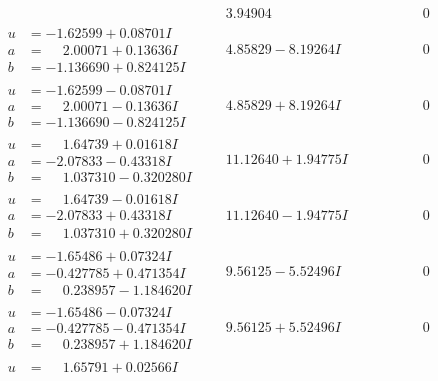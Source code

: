 \documentclass[1p]{elsarticle_modified}
\theoremstyle{definition}
\begin{document}
$$\begin{array}{c|c|c}
 & \phantom{-}3.94904\phantom{ +0.000000I} & \phantom{-0.000000 } 0 \\ \hline\begin{aligned}
u &= -1.62599 + 0.08701 I \\
a &= \phantom{-}2.00071 + 0.13636 I \\
b &= -1.136690 + 0.824125 I\end{aligned}
 & \phantom{-}4.85829 - 8.19264 I & \phantom{-0.000000 } 0 \\ \hline\begin{aligned}
u &= -1.62599 - 0.08701 I \\
a &= \phantom{-}2.00071 - 0.13636 I \\
b &= -1.136690 - 0.824125 I\end{aligned}
 & \phantom{-}4.85829 + 8.19264 I & \phantom{-0.000000 } 0 \\ \hline\begin{aligned}
u &= \phantom{-}1.64739 + 0.01618 I \\
a &= -2.07833 - 0.43318 I \\
b &= \phantom{-}1.037310 - 0.320280 I\end{aligned}
 & \phantom{-}11.12640 + 1.94775 I & \phantom{-0.000000 } 0 \\ \hline\begin{aligned}
u &= \phantom{-}1.64739 - 0.01618 I \\
a &= -2.07833 + 0.43318 I \\
b &= \phantom{-}1.037310 + 0.320280 I\end{aligned}
 & \phantom{-}11.12640 - 1.94775 I & \phantom{-0.000000 } 0 \\ \hline\begin{aligned}
u &= -1.65486 + 0.07324 I \\
a &= -0.427785 + 0.471354 I \\
b &= \phantom{-}0.238957 - 1.184620 I\end{aligned}
 & \phantom{-}9.56125 - 5.52496 I & \phantom{-0.000000 } 0 \\ \hline\begin{aligned}
u &= -1.65486 - 0.07324 I \\
a &= -0.427785 - 0.471354 I \\
b &= \phantom{-}0.238957 + 1.184620 I\end{aligned}
 & \phantom{-}9.56125 + 5.52496 I & \phantom{-0.000000 } 0 \\ \hline\begin{aligned}
u &= \phantom{-}1.65791 + 0.02566 I \\

\end{aligned}
\end{array}$$
\end{document}
